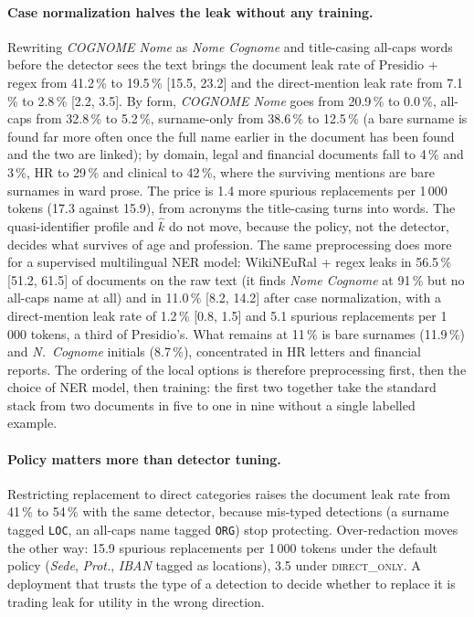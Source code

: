 \documentclass[11pt,a4paper]{article}
\newcommand{\pseud}[1]{\texttt{#1}}
\begin{document}
\paragraph{Case normalization halves the leak without any training.} Rewriting \emph{COGNOME Nome} as \emph{Nome Cognome} and title-casing all-caps words before the detector sees the text brings the document leak rate of Presidio + regex from 41.2\,\% to 19.5\,\% [15.5, 23.2] and the direct-mention leak rate from 7.1\,\% to 2.8\,\% [2.2, 3.5]. By form, \emph{COGNOME Nome} goes from 20.9\,\% to 0.0\,\%, all-caps from 32.8\,\% to 5.2\,\%, surname-only from 38.6\,\% to 12.5\,\% (a bare surname is found far more often once the full name earlier in the document has been found and the two are linked); by domain, legal and financial documents fall to 4\,\% and 3\,\%, HR to 29\,\% and clinical to 42\,\%, where the surviving mentions are bare surnames in ward prose. The price is 1.4 more spurious replacements per 1\,000 tokens (17.3 against 15.9), from acronyms the title-casing turns into words. The quasi-identifier profile and $\hat k$ do not move, because the policy, not the detector, decides what survives of age and profession. The same preprocessing does more for a supervised multilingual NER model: WikiNEuRal + regex leaks in 56.5\,\% [51.2, 61.5] of documents on the raw text (it finds \emph{Nome Cognome} at 91\,\% but no all-caps name at all) and in 11.0\,\% [8.2, 14.2] after case normalization, with a direct-mention leak rate of 1.2\,\% [0.8, 1.5] and 5.1 spurious replacements per 1\,000 tokens, a third of Presidio's. What remains at 11\,\% is bare surnames (11.9\,\%) and \emph{N.~Cognome} initials (8.7\,\%), concentrated in HR letters and financial reports. The ordering of the local options is therefore preprocessing first, then the choice of NER model, then training: the first two together take the standard stack from two documents in five to one in nine without a single labelled example.

\paragraph{Policy matters more than detector tuning.} Restricting replacement to direct categories raises the document leak rate from 41\,\% to 54\,\% with the same detector, because mis-typed detections (a surname tagged \pseud{LOC}, an all-caps name tagged \pseud{ORG}) stop protecting. Over-redaction moves the other way: 15.9 spurious replacements per 1\,000 tokens under the default policy (\emph{Sede}, \emph{Prot.}, \emph{IBAN} tagged as locations), 3.5 under \textsc{direct\_only}. A deployment that trusts the type of a detection to decide whether to replace it is trading leak for utility in the wrong direction.
\end{document}
